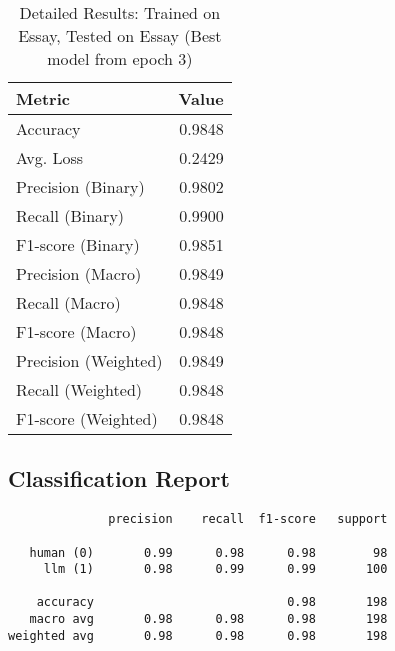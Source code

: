 \documentclass{article}
\begin{document}
\begin{table}[htbp]
\centering
\caption*{Detailed Results: Trained on Essay, Tested on Essay (Best model from epoch 3)}
\begin{tabular}{@{}lr@{}}
\toprule
Metric & Value \\
\midrule
Accuracy & 0.9848 \\
Avg. Loss & 0.2429 \\
Precision (Binary) & 0.9802 \\
Recall (Binary) & 0.9900 \\
F1-score (Binary) & 0.9851 \\
Precision (Macro) & 0.9849 \\
Recall (Macro) & 0.9848 \\
F1-score (Macro) & 0.9848 \\
Precision (Weighted) & 0.9849 \\
Recall (Weighted) & 0.9848 \\
F1-score (Weighted) & 0.9848 \\
\bottomrule
\end{tabular}
\subsection*{Classification Report}
\begin{verbatim}
              precision    recall  f1-score   support

   human (0)       0.99      0.98      0.98        98
     llm (1)       0.98      0.99      0.99       100

    accuracy                           0.98       198
   macro avg       0.98      0.98      0.98       198
weighted avg       0.98      0.98      0.98       198
\end{verbatim}
\end{table}
\end{document}
